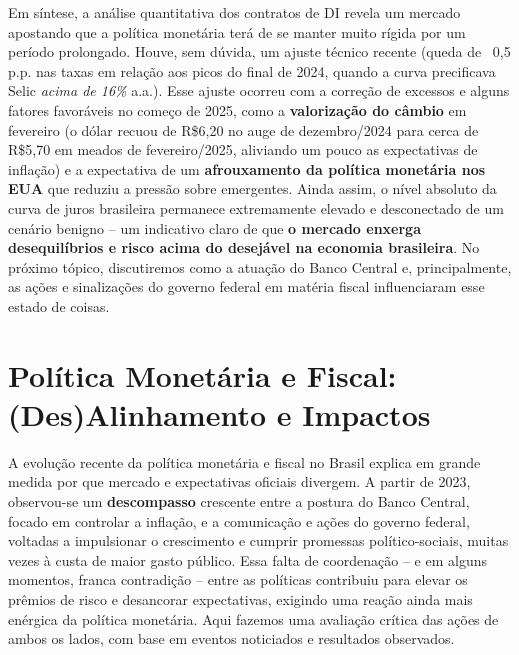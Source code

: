 \documentclass[a4paper,12pt]{article}
\begin{document}
Em síntese, a análise quantitativa dos contratos de DI revela um mercado apostando que a política monetária terá de se manter muito rígida por um período prolongado. Houve, sem dúvida, um ajuste técnico recente (queda de ~0,5 p.p. nas taxas em relação aos picos do final de 2024, quando a curva precificava Selic \emph{acima de 16\%} a.a.). Esse ajuste ocorreu com a correção de excessos e alguns fatores favoráveis no começo de 2025, como a \textbf{valorização do câmbio} em fevereiro (o dólar recuou de R\$6,20 no auge de dezembro/2024 para cerca de R\$5,70 em meados de fevereiro/2025, aliviando um pouco as expectativas de inflação) e a expectativa de um \textbf{afrouxamento da política monetária nos EUA} que reduziu a pressão sobre emergentes. Ainda assim, o nível absoluto da curva de juros brasileira permanece extremamente elevado e desconectado de um cenário benigno -- um indicativo claro de que \textbf{o mercado enxerga desequilíbrios e risco acima do desejável na economia brasileira}. No próximo tópico, discutiremos como a atuação do Banco Central e, principalmente, as ações e sinalizações do governo federal em matéria fiscal influenciaram esse estado de coisas.

\section{Política Monetária e Fiscal: (Des)Alinhamento e Impactos}

A evolução recente da política monetária e fiscal no Brasil explica em grande medida por que mercado e expectativas oficiais divergem. A partir de 2023, observou-se um \textbf{descompasso} crescente entre a postura do Banco Central, focado em controlar a inflação, e a comunicação e ações do governo federal, voltadas a impulsionar o crescimento e cumprir promessas político-sociais, muitas vezes à custa de maior gasto público. Essa falta de coordenação -- e em alguns momentos, franca contradição -- entre as políticas contribuiu para elevar os prêmios de risco e desancorar expectativas, exigindo uma reação ainda mais enérgica da política monetária. Aqui fazemos uma avaliação crítica das ações de ambos os lados, com base em eventos noticiados e resultados observados.
\end{document}
